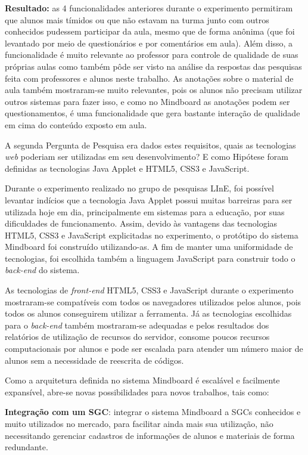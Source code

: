 \textbf{Resultado:} as 4 funcionalidades anteriores durante o experimento permitiram que alunos mais tímidos ou que não estavam na turma junto com outros conhecidos pudessem participar da aula, mesmo que de forma anônima (que foi levantado por meio de questionários e por comentários em aula). Além disso, a funcionalidade é muito relevante ao professor para controle de qualidade de suas próprias aulas como também pôde ser visto na análise da respostas das pesquisas feita com professores e alunos neste trabalho. 
As anotações sobre o material de aula também mostraram-se muito relevantes, pois os alunos não precisam utilizar outros sistemas para fazer isso, e como no Mindboard as anotações podem ser questionamentos, é uma funcionalidade que gera bastante interação de qualidade em cima do conteúdo exposto em aula.

A segunda Pergunta de Pesquisa era dados estes requisitos, quais as tecnologias \emph{web} poderiam ser utilizadas em seu desenvolvimento? E como Hipótese foram definidas as tecnologias Java Applet e HTML5, CSS3 e JavaScript.

Durante o experimento realizado no grupo de pesquisas LInE, foi possível levantar indícios que a tecnologia Java Applet possui muitas barreiras para ser utilizada hoje em dia, principalmente em sistemas para a educação, por suas dificuldades de funcionamento. Assim, devido às vantagens das tecnologias HTML5, CSS3 e JavaScript explicitadas no experimento, o protótipo do sistema Mindboard foi construído utilizando-as. A fim de manter uma uniformidade de tecnologias, foi escolhida também a linguagem JavaScript para construir todo o \emph{back-end} do sistema.

As tecnologias de \emph{front-end} HTML5, CSS3 e JavaScript durante o experimento mostraram-se compatíveis com todos os navegadores utilizados pelos alunos, pois todos os alunos conseguirem utilizar a ferramenta. Já as tecnologias escolhidas para o \emph{back-end} também mostraram-se adequadas e pelos resultados dos relatórios de utilização de recursos do servidor, consome poucos recursos computacionais por alunos e pode ser escalada para atender um número maior de alunos sem a necessidade de reescrita de códigos.

Como a arquitetura definida no sistema Mindboard é escalável e facilmente expansível, abre-se novas possibilidades para novos trabalhos, tais como:

\textbf{Integração com um SGC}: integrar o sistema Mindboard a SGCs conhecidos e muito utilizados no mercado, para facilitar ainda mais sua utilização, não necessitando gerenciar cadastros de informações de alunos e materiais de forma redundante.


